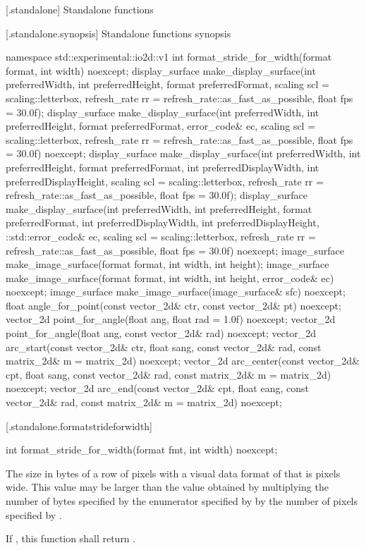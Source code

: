  [\iotwod.standalone] {Standalone functions}

 [\iotwod.standalone.synopsis] {Standalone functions synopsis}

\begin{codeblock}
namespace std::experimental::io2d::v1 {
  int format_stride_for_width(format format, int width) noexcept;
  display_surface make_display_surface(int preferredWidth,
    int preferredHeight, format preferredFormat,
    scaling scl = scaling::letterbox,
    refresh_rate rr = refresh_rate::as_fast_as_possible, float fps = 30.0f);
  display_surface make_display_surface(int preferredWidth,
    int preferredHeight, format preferredFormat, error_code& ec,
    scaling scl = scaling::letterbox,
    refresh_rate rr = refresh_rate::as_fast_as_possible, float fps = 30.0f) noexcept;
  display_surface make_display_surface(int preferredWidth,
    int preferredHeight, format preferredFormat, int preferredDisplayWidth, 
    int preferredDisplayHeight, scaling scl = scaling::letterbox,
    refresh_rate rr = refresh_rate::as_fast_as_possible, float fps = 30.0f);
  display_surface make_display_surface(int preferredWidth,
    int preferredHeight, format preferredFormat, int preferredDisplayWidth, 
    int preferredDisplayHeight, ::std::error_code& ec,
    scaling scl = scaling::letterbox,
    refresh_rate rr = refresh_rate::as_fast_as_possible, float fps = 30.0f) noexcept;
  image_surface make_image_surface(format format, int width, int height);
  image_surface make_image_surface(format format, int width, int height, 
    error_code& ec) noexcept;
  image_surface make_image_surface(image_surface& sfc) noexcept;
  float angle_for_point(const vector_2d& ctr, const vector_2d& pt) noexcept;
  vector_2d point_for_angle(float ang, float rad = 1.0f) noexcept;
  vector_2d point_for_angle(float ang, const vector_2d& rad) noexcept;
  vector_2d arc_start(const vector_2d& ctr, float sang, const vector_2d& rad, 
    const matrix_2d& m = matrix_2d{}) noexcept;
  vector_2d arc_center(const vector_2d& cpt, float sang, const vector_2d& rad, 
    const matrix_2d& m = matrix_2d{}) noexcept;
  vector_2d arc_end(const vector_2d& cpt, float eang, const vector_2d& rad, 
    const matrix_2d& m = matrix_2d{}) noexcept;
}
\end{codeblock}

 [\iotwod.standalone.formatstrideforwidth] {}

%
\begin{itemdecl}
int format_stride_for_width(format fmt, int width) noexcept;
\end{itemdecl}
\begin{itemdescr}
\pnum
\returns
The size in bytes of a row of pixels with a visual data format of  that is  pixels wide. This value may be larger than the value obtained by multiplying the number of bytes specified by the  enumerator specified by  by the number of pixels specified by .

\pnum
If , this function shall return .
\end{itemdescr}

